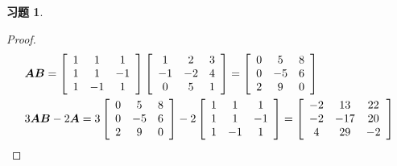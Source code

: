 \documentclass{ctexart}
\newtheorem{problem}{习题}[section]
\begin{document}
\begin{problem}
\end{problem}
\begin{proof}
    \begin{align*}
         & \boldsymbol{A}\boldsymbol{B}           =
        \left[\begin{array}{ccc}
                1 & 1  & 1  \\
                1 & 1  & -1 \\
                1 & -1 & 1
            \end{array}\right]
        \left[\begin{array}{ccc}
                1  & 2  & 3 \\
                -1 & -2 & 4 \\
                0  & 5  & 1
            \end{array}\right]=
        \left[\begin{array}{ccc}
                0 & 5  & 8 \\
                0 & -5 & 6 \\
                2 & 9  & 0
            \end{array}\right] \\
         & 3\boldsymbol{A}\boldsymbol{B}-2 \boldsymbol{A}  =
        3\left[\begin{array}{ccc}
                0 & 5  & 8 \\
                0 & -5 & 6 \\
                2 & 9  & 0
            \end{array}\right]
        -2\left[\begin{array}{ccc}
                1 & 1  & 1  \\
                1 & 1  & -1 \\
                1 & -1 & 1
            \end{array}\right]
        =\left[\begin{array}{ccc}
                -2 & 13  & 22 \\
                -2 & -17 & 20 \\
                4  & 29  & -2
            \end{array}\right]
    \end{align*}
\end{proof}
\end{document}
